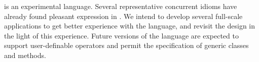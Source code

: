 {}\Xten{} is an experimental language.  Several representative
concurrent idioms have already found pleasant expression in \Xten. We
intend to develop several full-scale applications to get better
experience with the language, and revisit the design in the light of
this experience. Future versions of the language are expected to
support user-definable operators and permit the specification of
generic classes and methods.


